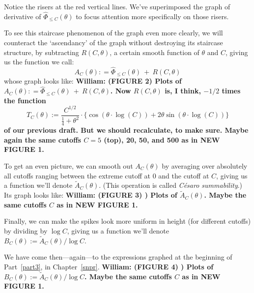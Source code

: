 \documentclass[openany]{book}
\theoremstyle{plain}
\theoremstyle{definition}
\begin{document}
{{\vskip20pt
  Notice the risers at the red vertical lines. We've superimposed the graph of  derivative of ${\hat \Phi}_{\le C}(\theta)$ to focus attention more specifically on those risers.

   To see this staircase phenomenon of the graph even more clearly, we will counteract the `ascendancy' of the graph without destroying its staircase structure,  by  subtracting  $R(C,\theta)$, a certain smooth function {\bibnote{$\dots$}}  of $\theta$ and $C$, giving us the function we call: $$A_C(\theta): = {\hat \Phi}_{\le C}(\theta)\ + \ R(C,\theta)$$ whose graph looks like:
     \vskip20pt
{\bf William: (FIGURE 2)  Plots of $A_C(\theta): = {\hat \Phi}_{\le C}(\theta)\ + \ R(C,\theta)$. Now  $R(C,\theta)$ is,  I think, $-1/2$ times the function $$T_C(\theta):=
      {\frac{C^{1/2}}{{\frac{1}{4}}+\theta^2}}\cdot\big\{\cos(\theta\cdot\log(C))+2\theta\sin(\theta\cdot
      \log(C))\big\}$$ of our previous draft. But we should recalculate, to make sure.  Maybe  again the same cutoffs $C=5$ (top), 20, 50, and 500 as in NEW FIGURE 1.}
   \vskip20pt

   To get an even picture, we can smooth out  $A_C(\theta)$ by averaging over absolutely all cutoffs ranging between  the extreme cutoff at $0$ and the cutoff at $C$, giving us a function we'll denote ${\tilde A}_C(\theta)$. (This operation is called {\it C{\'e}saro summability}.) Its graph  looks like:
     \vskip20pt
{\bf William: (FIGURE 3)  )  Plots of ${\tilde A}_C(\theta)$.  Maybe the same cutoffs $C$ as in NEW FIGURE 1.}
   \vskip20pt

   Finally, we can
 make the spikes look more uniform in height (for different cutoffs) by dividing by $\log C$, giving us a function we'll denote $B_C(\theta):={\tilde A}_C(\theta)/\log C$.

  We have come then---again---to the expressions graphed at the beginning of Part~\ref{part3}, in
  Chapter~\ref{snpr}.
      \vskip20pt
{\bf William: (FIGURE 4)  )  Plots of $B_C(\theta):={\tilde A}_C(\theta)/\log C$.  Maybe the same cutoffs $C$ as in NEW FIGURE 1.}
   \vskip20pt


}}
\end{document}

